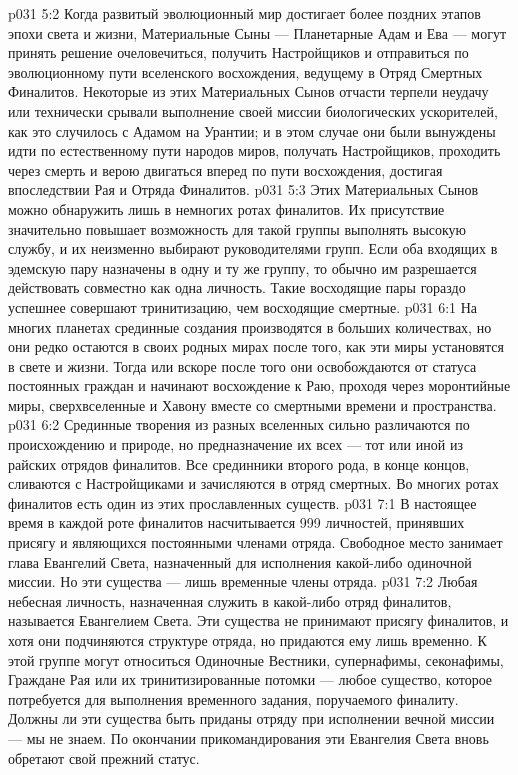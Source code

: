\vs p031 5:2 Когда развитый эволюционный мир достигает более поздних этапов эпохи света и жизни, Материальные Сыны --- Планетарные Адам и Ева --- могут принять решение очеловечиться, получить Настройщиков и отправиться по эволюционному пути вселенского восхождения, ведущему в Отряд Смертных Финалитов. Некоторые из этих Материальных Сынов отчасти терпели неудачу или технически срывали выполнение своей миссии биологических ускорителей, как это случилось с Адамом на Урантии; и в этом случае они были вынуждены идти по естественному пути народов миров, получать Настройщиков, проходить через смерть и верою двигаться вперед по пути восхождения, достигая впоследствии Рая и Отряда Финалитов.
\vs p031 5:3 Этих Материальных Сынов можно обнаружить лишь в немногих ротах финалитов. Их присутствие значительно повышает возможность для такой группы выполнять высокую службу, и их неизменно выбирают руководителями групп. Если оба входящих в эдемскую пару назначены в одну и ту же группу, то обычно им разрешается действовать совместно как одна личность. Такие восходящие пары гораздо успешнее совершают тринитизацию, чем восходящие смертные.
\vs p031 6:1 На многих планетах срединные создания производятся в больших количествах, но они редко остаются в своих родных мирах после того, как эти миры установятся в свете и жизни. Тогда или вскоре после того они освобождаются от статуса постоянных граждан и начинают восхождение к Раю, проходя через моронтийные миры, сверхвселенные и Хавону вместе со смертными времени и пространства.
\vs p031 6:2 Срединные творения из разных вселенных сильно различаются по происхождению и природе, но предназначение их всех --- тот или иной из райских отрядов финалитов. Все срединники второго рода, в конце концов, сливаются с Настройщиками и зачисляются в отряд смертных. Во многих ротах финалитов есть один из этих прославленных существ.
\vs p031 7:1 В настоящее время в каждой роте финалитов насчитывается 999 личностей, принявших присягу и являющихся постоянными членами отряда. Свободное место занимает глава Евангелий Света, назначенный для исполнения какой\hyp{}либо одиночной миссии. Но эти существа --- лишь временные члены отряда.
\vs p031 7:2 Любая небесная личность, назначенная служить в какой\hyp{}либо отряд финалитов, называется Евангелием Света. Эти существа не принимают присягу финалитов, и хотя они подчиняются структуре отряда, но придаются ему лишь временно. К этой группе могут относиться Одиночные Вестники, супернафимы, секонафимы, Граждане Рая или их тринитизированные потомки --- любое существо, которое потребуется для выполнения временного задания, поручаемого финалиту. Должны ли эти существа быть приданы отряду при исполнении вечной миссии --- мы не знаем. По окончании прикомандирования эти Евангелия Света вновь обретают свой прежний статус.
